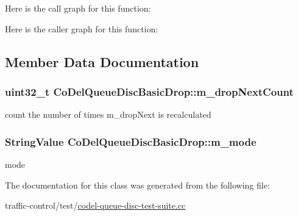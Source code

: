Here is the call graph for this function\+:




Here is the caller graph for this function\+:




\subsection{Member Data Documentation}
\subsubsection[{\texorpdfstring{m\+\_\+drop\+Next\+Count}{m_dropNextCount}}]{\setlength{\rightskip}{0pt plus 5cm}uint32\+\_\+t Co\+Del\+Queue\+Disc\+Basic\+Drop\+::m\+\_\+drop\+Next\+Count\hspace{0.3cm}{\ttfamily [private]}}\hypertarget{classCoDelQueueDiscBasicDrop_a64c30d2e4ddd98c5c71e7235d1435c59}{}\label{classCoDelQueueDiscBasicDrop_a64c30d2e4ddd98c5c71e7235d1435c59}


count the number of times m\+\_\+drop\+Next is recalculated 

\subsubsection[{\texorpdfstring{m\+\_\+mode}{m_mode}}]{\setlength{\rightskip}{0pt plus 5cm}String\+Value Co\+Del\+Queue\+Disc\+Basic\+Drop\+::m\+\_\+mode\hspace{0.3cm}{\ttfamily [private]}}\hypertarget{classCoDelQueueDiscBasicDrop_a1208afca60fdedfcb0be0a73a5905aa7}{}\label{classCoDelQueueDiscBasicDrop_a1208afca60fdedfcb0be0a73a5905aa7}


mode 



The documentation for this class was generated from the following file\+:\begin{DoxyCompactItemize}
\item 
traffic-\/control/test/\hyperlink{codel-queue-disc-test-suite_8cc}{codel-\/queue-\/disc-\/test-\/suite.\+cc}\end{DoxyCompactItemize}
